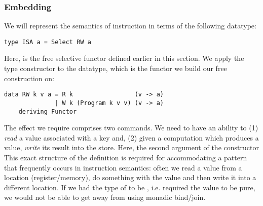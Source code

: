 \subsubsection{Embedding}

We will represent the semantics of instruction in terms of the following datatype:

\begin{verbatim}
type ISA a = Select RW a
\end{verbatim}

Here,  is the free selective functor defined earlier in this section.
We apply the  type constructor to the  datatype, which is the
functor we build our free construction on:

\begin{verbatim}
data RW k v a = R k                 (v -> a)
              | W k (Program k v v) (v -> a)
    deriving Functor
\end{verbatim}

The effect we require comprises two commands. We need to have an ability to (1)
\emph{read} a value associated with a key and, (2) given a computation which produces a value,
\emph{write} its result into the store. Here, the second argument of the  constructor
This exact structure of the definition is required for accommodating a pattern that
frequently occurs in instruction semantics: often we read a value from a location
(register/memory), do something with the value and then write it into a different location.
If we had the type of  to be , i.e. required the value to be pure,
we would not be able to get away from using monadic bind/join.





